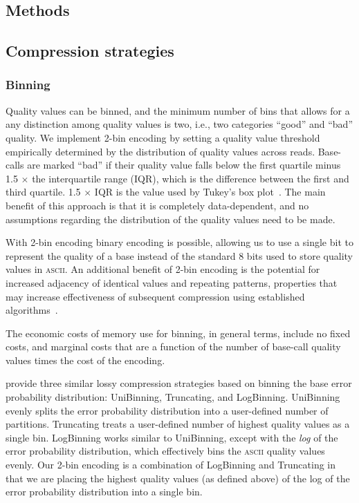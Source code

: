 \documentclass{bioinfo}
\begin{document}
\begin{methods}
\section{Methods}

\subsection{Compression strategies}

\subsubsection{Binning}

Quality values can be binned, and the minimum number of bins that
allows for a any distinction among quality values is two, i.e., two
categories ``good'' and ``bad'' quality. We implement 2-bin encoding
by setting a quality value threshold empirically determined by the
distribution of quality values across reads. Base-calls are marked
``bad'' if their quality value falls below the first quartile minus
1.5 $\times$ the interquartile range (IQR), which is the difference
between the first and third quartile. 1.5 $\times$ IQR is the value
used by Tukey's box plot~\citep{mcgill1978variations}. The main
benefit of this approach is that it is completely data-dependent, and
no assumptions regarding the distribution of the quality values need
to be made.
 
With 2-bin encoding binary encoding is possible, allowing us to use a
single bit to represent the quality of a base instead of the standard
8 bits used to store quality values in \textsc{ascii}. An additional
benefit of 2-bin encoding is the potential for increased adjacency of
identical values and repeating patterns, properties that may increase
effectiveness of subsequent compression using established
algorithms~\cite[e.g.,][]{HUFFMAN:1952nr,Ziv77auniversal,
  DBLP:journals/tit/ZivL78}.

The economic costs of memory use for binning, in general terms,
include no fixed costs, and marginal costs that are a function of the
number of base-call quality values times the cost of the encoding.

\cite{Wan:2012kq} provide three similar lossy compression strategies based on binning the base error probability distribution: UniBinning, Truncating, and LogBinning.
UniBinning evenly splits the error probability distribution into a user-defined number of partitions.
Truncating treats a user-defined number of highest quality values as a single bin.
LogBinning works similar to UniBinning, except with the \emph{log} of the error probability distribution, which effectively bins the \textsc{ascii} quality values evenly.
Our 2-bin encoding is a combination of LogBinning and Truncating in that we are placing the highest quality values (as defined above) of the log of the error probability distribution into a single bin.


\end{methods}
\end{document}

